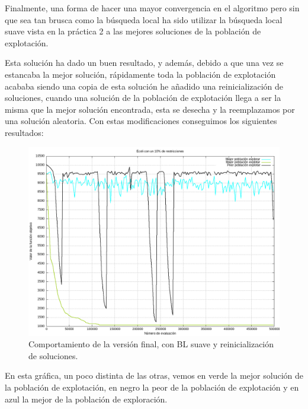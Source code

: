 \documentclass[12pt, spanish]{article}
\begin{document}
Finalmente, una forma de hacer una mayor convergencia en el algoritmo pero sin que sea tan brusca como la búsqueda local ha sido utilizar la búsqueda local suave vista en la práctica 2 a las mejores soluciones de la población de explotación.

Esta solución ha dado un buen resultado, y además, debido a que una vez se estancaba la mejor solución, rápidamente toda la población de explotación acababa siendo una copia de esta solución he añadido una reinicialización de soluciones, cuando una solución de la población de explotación llega a ser la misma que la mejor solución encontrada, esta se desecha y la reemplazamos por una solución aleatoria. Con estas modificaciones conseguimos los siguientes resultados:


\begin{figure}[H]
	\centering
	\includegraphics[scale = 0.50]{final_ecoli.png}
	
	\caption{Comportamiento de la versión final, con BL suave y reinicialización de soluciones.}
	\label{fig:final_ecoli}
\end{figure}

En esta gráfica, un poco distinta de las otras, vemos en verde la mejor solución de la población de explotación, en negro la peor de la población de explotación y en azul la mejor de la población de exploración.
\end{document}

